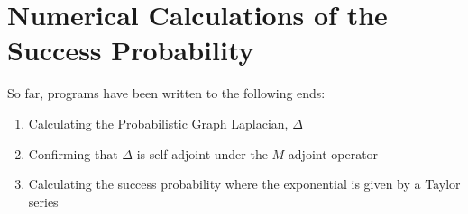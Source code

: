 \section{Numerical Calculations of the Success Probability}
So far, programs have been written to the following ends:
\begin{enumerate}
\item Calculating the Probabilistic Graph Laplacian, $\Delta$
\item Confirming that $\Delta$ is self-adjoint under the $M$-adjoint operator
\item Calculating the success probability where the exponential is given by a Taylor series
\end{enumerate}